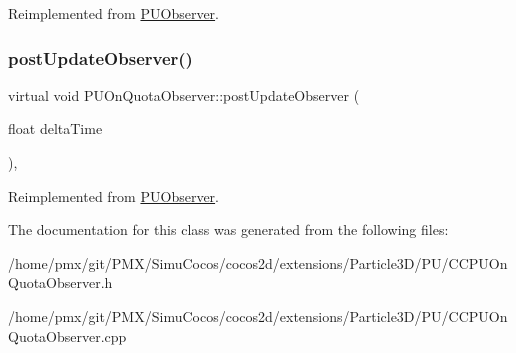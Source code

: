 Reimplemented from \hyperlink{classPUObserver}{P\+U\+Observer}.

\mbox{\label{classPUOnQuotaObserver_a3ed011d5744f38ea99f0ad4836a6ebd6}} 
\subsubsection{\texorpdfstring{post\+Update\+Observer()}{postUpdateObserver()}\hspace{0.1cm}{\footnotesize\ttfamily [2/2]}}
{\footnotesize\ttfamily virtual void P\+U\+On\+Quota\+Observer\+::post\+Update\+Observer (\begin{DoxyParamCaption}\item[{float}]{delta\+Time }\end{DoxyParamCaption})\hspace{0.3cm}{\ttfamily [override]}, {\ttfamily [virtual]}}







Reimplemented from \hyperlink{classPUObserver}{P\+U\+Observer}.



The documentation for this class was generated from the following files\+:\begin{DoxyCompactItemize}
\item 
/home/pmx/git/\+P\+M\+X/\+Simu\+Cocos/cocos2d/extensions/\+Particle3\+D/\+P\+U/C\+C\+P\+U\+On\+Quota\+Observer.\+h\item 
/home/pmx/git/\+P\+M\+X/\+Simu\+Cocos/cocos2d/extensions/\+Particle3\+D/\+P\+U/C\+C\+P\+U\+On\+Quota\+Observer.\+cpp\end{DoxyCompactItemize}
